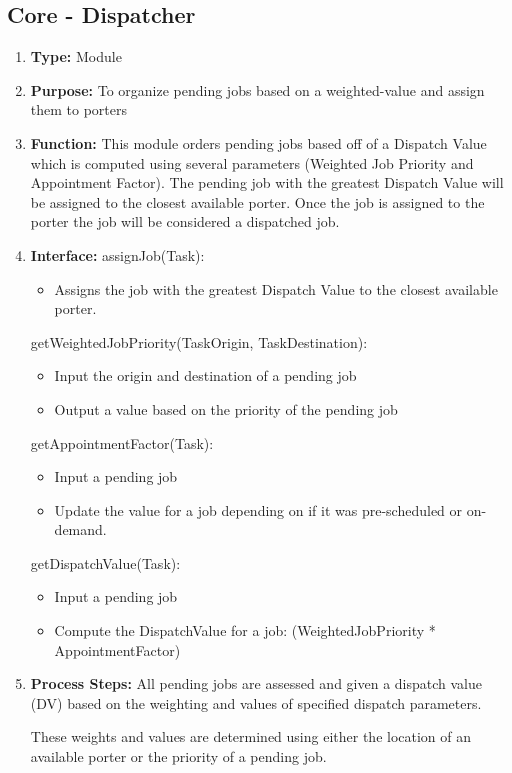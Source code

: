\documentclass[paper=letter, fontsize=10pt]{scrartcl}
\numberwithin{equation}{section}		%
\numberwithin{figure}{section}			%
\numberwithin{table}{section}				%
\begin{document}
\subsection{Core - Dispatcher}
\begin{enumerate}[]
	\item \textbf{Type:} Module
	\item \textbf{Purpose:} To organize pending jobs based on a weighted-value and assign them to porters 
	\item \textbf{Function:} This module orders pending jobs based off of a Dispatch Value which is computed using several parameters (Weighted Job Priority and Appointment Factor).  The pending job with the greatest Dispatch Value will be assigned to the closest available porter.  Once the job is assigned to the porter the job will be considered a dispatched job.
	\item \textbf{Interface:} \newline
	 assignJob(Task):
	 	\begin{itemize}
	 		\item Assigns the job with the greatest Dispatch Value to the closest available porter.
	 	\end{itemize}
	 getWeightedJobPriority(TaskOrigin, TaskDestination):
	 	\begin{itemize}
	 		\item Input the origin and destination of a pending job
	 		\item Output a value based on the priority of the pending job
	 	\end{itemize}
	 getAppointmentFactor(Task):
	 	\begin{itemize}
	 		\item Input a pending job
	 		\item Update the value for a job depending on if it was pre-scheduled or on-demand.
	 	\end{itemize}
	 getDispatchValue(Task):
	 	\begin{itemize}
	 		\item Input a pending job
	 		\item Compute the DispatchValue for a job: (WeightedJobPriority * AppointmentFactor) 
	 	\end{itemize}
	\item \textbf{Process Steps:}
	All pending jobs are assessed and given a dispatch value (DV) based on the weighting and values of specified dispatch parameters.
	
	These weights and values are determined using either the location of an available porter or the priority of a pending job.
	

\end{enumerate}
\end{document}
